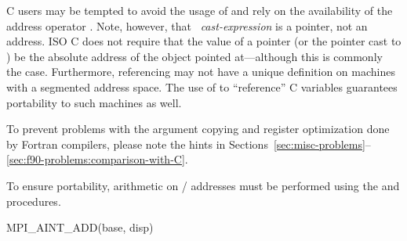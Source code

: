 \begin{users}
C users may be tempted to avoid the usage of
and rely on
the availability of the address operator \code{\&}.  Note, however, that
\code{\&}~\emph{cast-expression} is a pointer, not an
address.
ISO C
does not require that the value of a pointer
(or the pointer cast to ) be
the absolute address of the object pointed at---although this is
commonly the case.
Furthermore, referencing may not have a unique
definition on machines with a segmented address space.
The use of
to ``reference'' C
variables guarantees portability to such machines as well.
\end{users}

\begin{users}
  To prevent problems with the argument copying and register optimization done
  by Fortran compilers, please note the hints in
Sections~\ref{sec:misc-problems}--\ref{sec:f90-problems:comparison-with-C}.
\end{users}

To ensure portability, arithmetic on \MPI/ addresses must be
performed using the 
and  procedures.

%
\begin{funcdef}{MPI\_AINT\_ADD}{(\mbox{base}, \mbox{disp})}
\end{funcdef}

